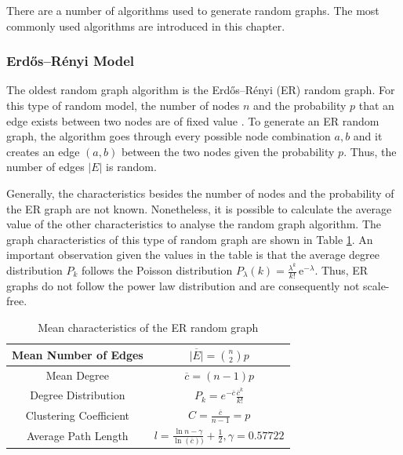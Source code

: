 There are a number of algorithms used to generate random graphs.
The most commonly used algorithms are introduced in this chapter.

\subsubsection{Erdős–Rényi Model}

The oldest random graph algorithm is the 
Erdős–Rényi (ER) random graph. For this type of random model, the
number of nodes $n$ and the probability $p$ that an 
edge exists between two nodes are of fixed value \cite{basicnetwork}. 
To generate an ER random graph, the algorithm goes through 
every possible node combination $a, b$ and it creates an edge 
$(a, b)$ between the two nodes given the probability $p$. 
Thus, the number of edges $|E|$ is random.

Generally, the characteristics besides the number of nodes and the
probability of the ER graph are not known.
Nonetheless, it is possible to calculate the average value of the other
characteristics to analyse the random graph algorithm.
The graph characteristics of this type of random graph are shown in Table 
\ref{erdos-model}.
An important observation given the values in the table is that 
the average degree distribution $P_k$ follows the Poisson distribution
$P_\lambda (k) = \frac{\lambda^k}{k!}\, \mathrm{e}^{-\lambda}$. Thus,
ER graphs do not follow the power law distribution and are consequently
not scale-free. 

\begin{table}[ht!]
    \centering
    \begin{tabular}{|c | c |} 
     \hline
     Mean Number of Edges & 
     $\overline{|E|} = \binom{n}{2}p$  \\ 
     \hline
     Mean Degree & 
     $\overline{c} = (n-1)p$ \\ 
     \hline
     Degree Distribution & 
     $P_k = e^{-\overline{c}} \frac{\overline{c}^k}{k!}$ \\ 
     \hline
     Clustering Coefficient & 
     $C=\frac{\overline{c}}{n-1}=p$ \\ 
     \hline
     Average Path Length \cite{averagepath}& 
     $l = \frac{\ln{n} - \gamma}{\ln(\overline{c}))} + \frac{1}{2}, 
     \gamma=0.57722$ \\ 
     \hline
    \end{tabular}
    \caption{Mean characteristics of the ER random graph \cite{basicnetwork}}
    \label{erdos-model}
\end{table}

